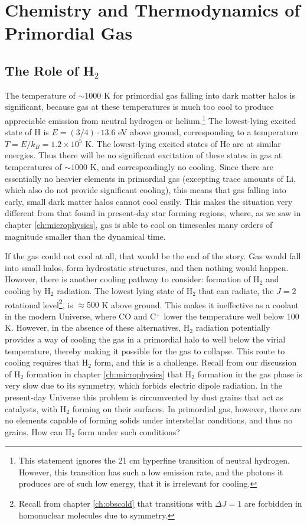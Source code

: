\section{Chemistry and Thermodynamics of Primordial Gas}

\subsection{The Role of H$_2$}

The temperature of $\sim 1000$ K for primordial gas falling into dark matter halos is significant, because gas at these temperatures is much too cool to produce appreciable emission from neutral hydrogen or helium.\footnote{This statement ignores the 21 cm hyperfine transition of neutral hydrogen. However, this transition has such a low emission rate, and the photons it produces are of such low energy, that it is irrelevant for cooling.} The lowest-lying excited state of H is $E = (3/4)\cdot 13.6$ eV above ground, corresponding to a temperature $T = E/k_B = 1.2\times 10^5$ K. The lowest-lying excited states of He are at similar energies. Thus there will be no significant excitation of these states in gas at temperatures of $\sim 1000$ K, and correspondingly no cooling. Since there are essentially no heavier elements in primordial gas (excepting trace amounts of Li, which also do not provide significant cooling), this means that gas falling into early, small dark matter halos cannot cool easily. This makes the situation very different from that found in present-day star forming regions, where, as we saw in chapter \ref{ch:microphysics}, gas is able to cool on timescales many orders of magnitude smaller than the dynamical time.

If the gas could not cool at all, that would be the end of the story. Gas would fall into small halos, form hydrostatic structures, and then nothing would happen. However, there is another cooling pathway to consider: formation of H$_2$ and cooling by H$_2$ radiation. The lowest lying state of H$_2$ that can radiate, the $J=2$ rotational level\footnote{Recall from chapter \ref{ch:obscold} that transitions with $\Delta J=1$ are forbidden in homonuclear molecules due to symmetry.}, is $\approx 500$ K above ground. This makes it ineffective as a coolant in the modern Universe, where CO and C$^+$ lower the temperature well below 100 K. However, in the absence of these alternatives, H$_2$ radiation potentially provides a way of cooling the gas in a primordial halo to well below the virial temperature, thereby making it possible for the gas to collapse. This route to cooling requires that H$_2$ form, and this is a challenge. Recall from our discussion of H$_2$ formation in chapter \ref{ch:microphysics} that H$_2$ formation in the gas phase is very slow due to its symmetry, which forbids electric dipole radiation. In the present-day Universe this problem is circumvented by dust grains that act as catalysts, with H$_2$ forming on their surfaces. In primordial gas, however, there are no elements capable of forming solids under interstellar conditions, and thus no grains. How can H$_2$ form under such conditions?

